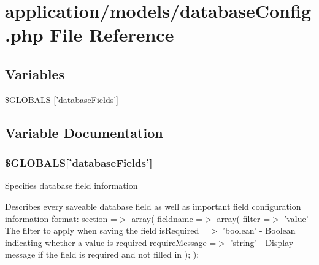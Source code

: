\hypertarget{database_config_8php}{\section{application/models/database\-Config.php File Reference}
\label{database_config_8php}
}
\subsection*{Variables}
\begin{DoxyCompactItemize}
\item 
\hyperlink{database_config_8php_a19c8e8ded07e4ea7de9917ebc505cc43}{\$\-G\-L\-O\-B\-A\-L\-S} \mbox{[}'database\-Fields'\mbox{]}
\end{DoxyCompactItemize}


\subsection{Variable Documentation}
\hypertarget{database_config_8php_a19c8e8ded07e4ea7de9917ebc505cc43}{
\subsubsection[{\$\-G\-L\-O\-B\-A\-L\-S}]{\setlength{\rightskip}{0pt plus 5cm}\$G\-L\-O\-B\-A\-L\-S\mbox{[}'database\-Fields'\mbox{]}}}\label{database_config_8php_a19c8e8ded07e4ea7de9917ebc505cc43}
Specifies database field information

Describes every saveable database field as well as important field configuration information format\-: section =$>$ array( fieldname =$>$ array( filter =$>$ 'value' -\/ The filter to apply when saving the field is\-Required =$>$ 'boolean' -\/ Boolean indicating whether a value is required require\-Message =$>$ 'string' -\/ Display message if the field is required and not filled in ); ); 